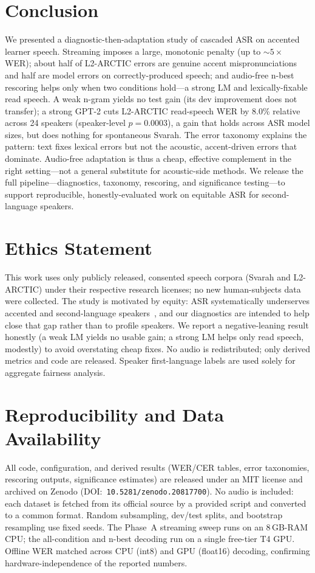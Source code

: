 \documentclass[conference]{IEEEtran}
\begin{document}
\section{Conclusion}
We presented a diagnostic-then-adaptation study of cascaded ASR on accented learner speech. Streaming imposes a large, monotonic penalty (up to $\sim5\times$ WER); about half of L2-ARCTIC errors are genuine accent mispronunciations and half are model errors on correctly-produced speech; and audio-free n-best rescoring helps only when two conditions hold---a strong LM and lexically-fixable read speech. A weak n-gram yields no test gain (its dev improvement does not transfer); a strong GPT-2 cuts L2-ARCTIC read-speech WER by 8.0\% relative across 24 speakers (speaker-level $p=0.0003$), a gain that holds across ASR model sizes, but does nothing for spontaneous Svarah. The error taxonomy explains the pattern: text fixes lexical errors but not the acoustic, accent-driven errors that dominate. Audio-free adaptation is thus a cheap, effective complement in the right setting---not a general substitute for acoustic-side methods. We release the full pipeline---diagnostics, taxonomy, rescoring, and significance testing---to support reproducible, honestly-evaluated work on equitable ASR for second-language speakers.

\section{Ethics Statement}
This work uses only publicly released, consented speech corpora (Svarah and L2-ARCTIC) under their respective research licenses; no new human-subjects data were collected. The study is motivated by equity: ASR systematically underserves accented and second-language speakers~\cite{koenecke,tatman}, and our diagnostics are intended to help close that gap rather than to profile speakers. We report a negative-leaning result honestly (a weak LM yields no usable gain; a strong LM helps only read speech, modestly) to avoid overstating cheap fixes. No audio is redistributed; only derived metrics and code are released. Speaker first-language labels are used solely for aggregate fairness analysis.

\section{Reproducibility and Data Availability}
All code, configuration, and derived results (WER/CER tables, error taxonomies, rescoring outputs, significance estimates) are released under an MIT license and archived on Zenodo (DOI:~\texttt{10.5281/zenodo.20817700}). No audio is included: each dataset is fetched from its official source by a provided script and converted to a common format. Random subsampling, dev/test splits, and bootstrap resampling use fixed seeds. The Phase~A streaming sweep runs on an 8\,GB-RAM CPU; the all-condition and n-best decoding run on a single free-tier T4 GPU. Offline WER matched across CPU (int8) and GPU (float16) decoding, confirming hardware-independence of the reported numbers.
\end{document}
